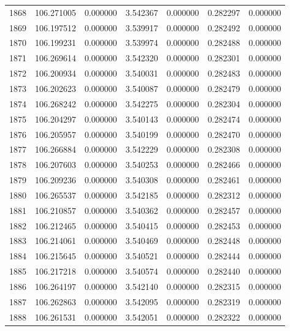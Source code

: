 \begin{tabular}{rrrrrrr}
1868 & 106.271005 &    0.000000 &  3.542367 &    0.000000 &    0.282297 &  0.000000 \\
1869 & 106.197512 &    0.000000 &  3.539917 &    0.000000 &    0.282492 &  0.000000 \\
1870 & 106.199231 &    0.000000 &  3.539974 &    0.000000 &    0.282488 &  0.000000 \\
1871 & 106.269614 &    0.000000 &  3.542320 &    0.000000 &    0.282301 &  0.000000 \\
1872 & 106.200934 &    0.000000 &  3.540031 &    0.000000 &    0.282483 &  0.000000 \\
1873 & 106.202623 &    0.000000 &  3.540087 &    0.000000 &    0.282479 &  0.000000 \\
1874 & 106.268242 &    0.000000 &  3.542275 &    0.000000 &    0.282304 &  0.000000 \\
1875 & 106.204297 &    0.000000 &  3.540143 &    0.000000 &    0.282474 &  0.000000 \\
1876 & 106.205957 &    0.000000 &  3.540199 &    0.000000 &    0.282470 &  0.000000 \\
1877 & 106.266884 &    0.000000 &  3.542229 &    0.000000 &    0.282308 &  0.000000 \\
1878 & 106.207603 &    0.000000 &  3.540253 &    0.000000 &    0.282466 &  0.000000 \\
1879 & 106.209236 &    0.000000 &  3.540308 &    0.000000 &    0.282461 &  0.000000 \\
1880 & 106.265537 &    0.000000 &  3.542185 &    0.000000 &    0.282312 &  0.000000 \\
1881 & 106.210857 &    0.000000 &  3.540362 &    0.000000 &    0.282457 &  0.000000 \\
1882 & 106.212465 &    0.000000 &  3.540415 &    0.000000 &    0.282453 &  0.000000 \\
1883 & 106.214061 &    0.000000 &  3.540469 &    0.000000 &    0.282448 &  0.000000 \\
1884 & 106.215645 &    0.000000 &  3.540521 &    0.000000 &    0.282444 &  0.000000 \\
1885 & 106.217218 &    0.000000 &  3.540574 &    0.000000 &    0.282440 &  0.000000 \\
1886 & 106.264197 &    0.000000 &  3.542140 &    0.000000 &    0.282315 &  0.000000 \\
1887 & 106.262863 &    0.000000 &  3.542095 &    0.000000 &    0.282319 &  0.000000 \\
1888 & 106.261531 &    0.000000 &  3.542051 &    0.000000 &    0.282322 &  0.000000 \\

\end{tabular}
